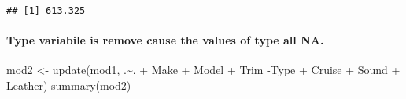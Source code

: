 \documentclass[
]{article}
\newenvironment{Shaded}{\begin{snugshade}}{\end{snugshade}}
\newcommand{\FunctionTok}[1]{\textcolor[rgb]{0.00,0.00,0.00}{#1}}
\newcommand{\NormalTok}[1]{#1}
\newcommand{\OtherTok}[1]{\textcolor[rgb]{0.56,0.35,0.01}{#1}}
\newcommand{\SpecialCharTok}[1]{\textcolor[rgb]{0.00,0.00,0.00}{#1}}
\begin{document}
\begin{verbatim}
## [1] 613.325
\end{verbatim}

\hypertarget{type-variabile-is-remove-cause-the-values-of-type-all-na.}{%
\paragraph{Type variabile is remove cause the values of type all
NA.}\label{type-variabile-is-remove-cause-the-values-of-type-all-na.}}

\begin{Shaded}
\begin{Highlighting}[]
\NormalTok{mod2 }\OtherTok{\textless{}{-}} \FunctionTok{update}\NormalTok{(mod1, .}\SpecialCharTok{\textasciitilde{}}\NormalTok{. }\SpecialCharTok{+}\NormalTok{ Make }\SpecialCharTok{+}\NormalTok{ Model }\SpecialCharTok{+}\NormalTok{ Trim }\SpecialCharTok{{-}}\NormalTok{Type }\SpecialCharTok{+}\NormalTok{ Cruise }\SpecialCharTok{+}\NormalTok{ Sound }\SpecialCharTok{+}\NormalTok{ Leather)}
\FunctionTok{summary}\NormalTok{(mod2)}
\end{Highlighting}
\end{Shaded}
\end{document}
